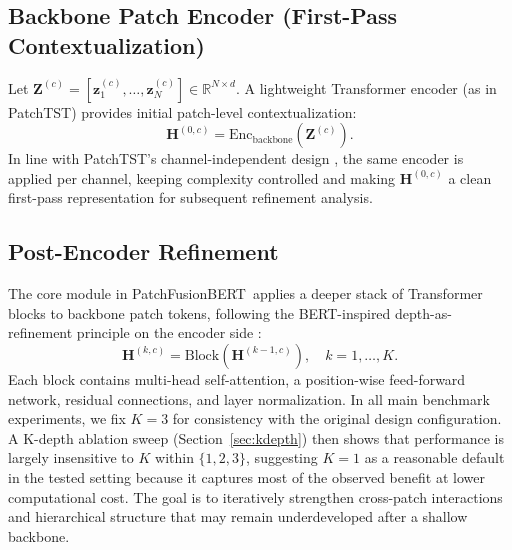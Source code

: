 \documentclass{ieeeaccess}
\newcommand{\model}{PatchFusionBERT\xspace}
\begin{document}
\subsection{Backbone Patch Encoder (First-Pass Contextualization)}
Let $\mathbf{Z}^{(c)} = [\mathbf{z}^{(c)}_1, \ldots, \mathbf{z}^{(c)}_N] \in
\mathbb{R}^{N \times d}$. A lightweight Transformer encoder (as in PatchTST) provides
initial patch-level contextualization:
\begin{equation}
    \mathbf{H}^{(0,c)} = \text{Enc}_{\text{backbone}}\left(\mathbf{Z}^{(c)}\right).
\end{equation}
In line with PatchTST's channel-independent design \cite{nie2023patchtst}, the same
encoder is applied per channel, keeping complexity controlled and making
$\mathbf{H}^{(0,c)}$ a clean first-pass representation for subsequent refinement
analysis.

\subsection{Post-Encoder Refinement}
The core module in \model\ applies a deeper stack of Transformer blocks to backbone
patch tokens, following the BERT-inspired depth-as-refinement principle on the encoder
side \cite{devlin2019bert}:
\begin{equation}
    \mathbf{H}^{(k,c)} = \text{Block}\left(\mathbf{H}^{(k-1,c)}\right), \quad k=1,\ldots,K.
\end{equation}
Each block contains multi-head self-attention, a position-wise feed-forward network,
residual connections, and layer normalization. In all main benchmark experiments, we
fix $K=3$ for consistency with the original design configuration. A K-depth ablation
sweep (Section~\ref{sec:kdepth}) then shows that performance is largely insensitive
to $K$ within $\{1,2,3\}$, suggesting $K=1$ as a reasonable default in the tested
setting because it captures most of the observed benefit at lower computational cost. The
goal is to iteratively strengthen cross-patch interactions and hierarchical structure
that may remain underdeveloped after a shallow backbone.
\end{document}
